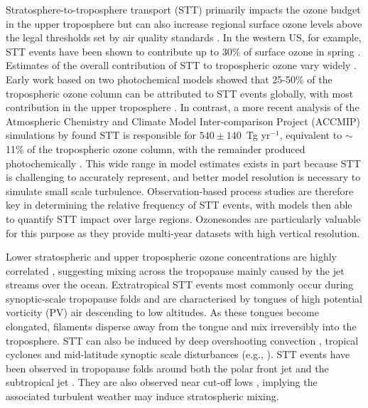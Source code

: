 Stratosphere-to-troposphere transport (STT) primarily impacts the ozone budget in the upper troposphere but can also increase regional surface ozone levels above the legal thresholds set by air quality standards \citep{Danielson1968, Lefohn2011, Langford2012, Zhang2014}.
In the western US, for example, STT events have been shown to contribute up to 30\% of surface ozone in spring \citep{Lin2012}.
Estimates of the overall contribution of STT to tropospheric ozone vary widely \citep[e.g.,][]{Galani2003, Stohl2003, Stevenson2006, Lefohn2011}.
Early work based on two photochemical models showed that 25-50\% of the tropospheric ozone column can be attributed to STT events globally, with most contribution in the upper troposphere \citep{Stohl2003}.
In contrast, a more recent analysis of the Atmospheric Chemistry and Climate Model Inter-comparison Project (ACCMIP) simulations by \citet{Young2013} found STT is responsible for $540\pm140$~Tg yr$^{-1}$, equivalent to $\sim$11\% of the tropospheric ozone column, with the remainder produced photochemically \citep{Monks2015}.
This wide range in model estimates exists in part because STT is challenging to accurately represent, and better model resolution is necessary to simulate small scale turbulence.
Observation-based process studies are therefore key in determining the relative frequency of STT events, with models then able to quantify STT impact over large regions.
Ozonesondes are particularly valuable for this purpose as they provide multi-year datasets with high vertical resolution.

Lower stratospheric and upper tropospheric ozone concentrations are highly correlated \citep{Terao2008}, suggesting mixing across the tropopause mainly caused by the jet streams over the ocean.
Extratropical STT events most commonly occur during synoptic-scale tropopause folds \citep{Sprenger2003, Tang2012, Frey2015} and are characterised by tongues of high potential vorticity (PV) air descending to low altitudes.
As these tongues become elongated, filaments disperse away from the tongue and mix irreversibly into the troposphere.
STT can also be induced by deep overshooting convection \citep{Frey2015}, tropical cyclones \citep{Das2016} and mid-latitude synoptic scale disturbances (e.g., \citet{Stohl2003, Mihalikova2012}). 
STT events have been observed in tropopause folds around both the polar front jet \citep{Vaughan1994, Beekmann1997} and the subtropical jet \citep{Baray2000}.
They are also observed near cut-off lows \citep{Price1993, Wirth1995}, implying the associated turbulent weather may induce stratospheric mixing.

